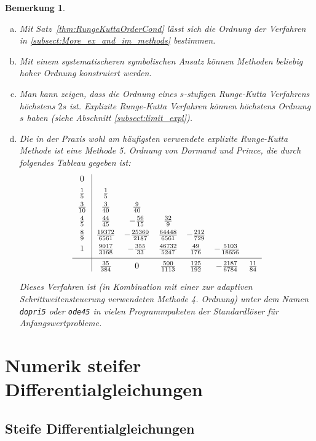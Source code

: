 \documentclass[
]{mycourse}
\theoremstyle{mythm}
\newtheorem{bemerkung}[theorem]{Bemerkung}
\theoremstyle{break}
\begin{document}
\begin{bemerkung}\label{remark:after_ordercond}
\begin{enumerate}[(a)]
\item Mit Satz~\ref{thm:RungeKuttaOrderCond} lässt sich die Ordnung der Verfahren in \ref{subsect:More_ex_and_im_methods} bestimmen.
\item Mit einem systematischeren \emph{symbolischen} Ansatz können Methoden beliebig hoher Ordnung konstruiert werden.
\item Man kann zeigen, dass die Ordnung eines $s$-stufigen Runge-Kutta Verfahrens höchstens $2s$ ist. Explizite Runge-Kutta
Verfahren können höchstens Ordnung $s$ haben (siehe Abschnitt \ref{subsect:limit_expl}).
\item Die in der Praxis wohl am häufigsten verwendete explizite Runge-Kutta Methode ist eine Methode 5. Ordnung von \emph{Dormand und Prince},
die durch folgendes Tableau gegeben ist:
\[
%
\begin{array}{c | c c c c c c}
0\\[+1ex]
\frac{1}{5} & \frac{1}{5}\\[+1ex]
\frac{3}{10} & \frac{3}{40} & \frac{9}{40}\\[+1ex]
\frac{4}{5} & \frac{44}{45} & -\frac{56}{15} & \frac{32}{9}\\[+1ex]
\frac{8}{9} & \frac{19372}{6561} & -\frac{25360}{2187} & \frac{64448}{6561} & -\frac{212}{729}\\[+1ex]
1 & \frac{9017}{3168} & -\frac{355}{33} & \frac{46732}{5247} & \frac{49}{176} & -\frac{5103}{18656}\\[+1ex] \hline 
\phantom{\frac{3}{3}^{\frac{3}{3}}}
& \frac{35}{384} & 0 & \frac{500}{1113} & \frac{125}{192} & -\frac{2187}{6784} & \frac{11}{84}
\end{array}
\]

Dieses Verfahren ist (in Kombination mit einer zur adaptiven Schrittweitensteuerung verwendeten Methode 4. Ordnung) unter dem Namen \texttt{dopri5} oder \texttt{ode45} in vielen Programmpaketen der Standardlöser für Anfangswertprobleme.
\end{enumerate}
\end{bemerkung}




\section{Numerik steifer Differentialgleichungen}\label{sect:steif}

\subsection{Steife Differentialgleichungen}\label{subsect:stiffness}
\end{document}
